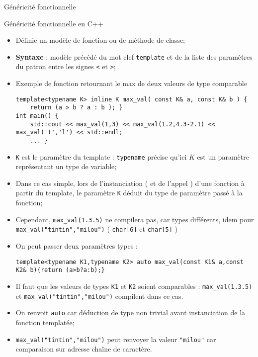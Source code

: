 \documentclass[handout,10pt]{beamer}
\begin{document}
\begin{frame}[fragile]{Généricité fonctionnelle}
\tiny
\begin{block}{Généricité fonctionnelle en C++}
\begin{itemize}
\item Définie un modèle de fonction ou de méthode de classe;
\item \textbf{Syntaxe} : modèle précédé du mot clef \lstinline$template$ et de la liste des paramètres du patron entre les signes 
\lstinline$<$ et \lstinline$>$;
\item {\color{blue}Exemple de fonction retournant le max de deux valeurs de type comparable}
\begin{lstlisting}
template<typename K> inline K max_val( const K& a, const K& b ) {
    return (a > b ? a : b ); }
int main() {
    std::cout << max_val(1,3) << max_val(1.2,4.3-2.1) << max_val('t','l') << std::endl;
    ... }
\end{lstlisting}
\item \lstinline$K$ est le paramètre du template : \lstinline$typename$ précise qu'ici $K$ est un paramètre représentant un type
de variable;
\item Dans ce cas simple, lors de l'instanciation ( et de l'appel ) d'une fonction à partir du template, le paramètre \lstinline$K$ déduit du type de paramètre passé à la fonction;
\item Cependant, \lstinline$max_val(1.3.5)$ ne compilera pas, car types différents, idem pour \lstinline$max_val("tintin","milou")$ ( \lstinline$char[6]$ et \lstinline$char[5]$ )
\item On peut passer deux paramètres types :
\begin{lstlisting}
template<typename K1,typename K2> auto max_val(const K1& a,const K2& b){return (a>b?a:b);}
\end{lstlisting}
\item Il faut que les valeurs de types \lstinline$K1$ et \lstinline$K2$ soient comparables : \lstinline$max_val(1.3.5)$  et \lstinline$max_val("tintin","milou")$ compilent dans ce cas.
\item On renvoit \lstinline$auto$ car déduction de type non trivial avant instanciation de la fonction templatée;
\item \lstinline$max_val("tintin","milou")$ peut renvoyer la valeur \lstinline$"milou"$ car comparaison sur adresse chaîne de caractère.
\end{itemize}
\end{block}
\end{frame}
\end{document}

